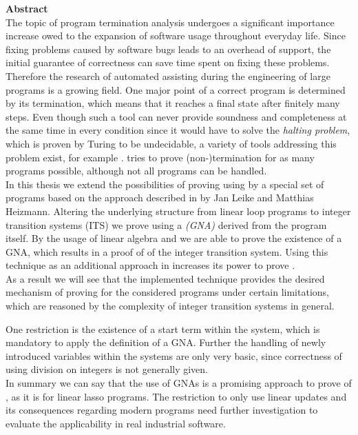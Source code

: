 {\bf\Large Abstract} \\ [1em] 

The topic of program termination analysis undergoes a significant importance increase owed to the expansion of software usage throughout everyday life. Since fixing problems caused by software bugs leads to an overhead of support, the initial guarantee of correctness can save time spent on fixing these problems. Therefore the research of automated assisting during the engineering of large programs is a growing field.
One major point of a correct program is determined by its termination, which means that it reaches a final state after finitely many steps. Even though such a tool can never provide soundness and completeness at the same time in every condition since it would have to solve the \textit{halting problem}, which is proven by Turing to be undecidable, a variety of tools addressing this problem exist, for example \aprove. \aprove tries to prove (non-)termination for as many programs possible, although not all programs can be handled.\newline \\
In this thesis we extend the possibilities of proving \nonterm using \aprove by a special set of programs based on the approach described in \cite{leike2014geometric} by Jan Leike and Matthias Heizmann. Altering the underlying structure from linear loop programs to integer transition systems (ITS) we prove \nonterm using a \textit{\gna (GNA)} derived from the program itself. By the usage of linear algebra and \solver we are able to prove the existence of a GNA, which results in a proof of \nonterm of the integer transition system. Using this technique as an additional approach in \aprove increases its power to prove \nonterm. 
\\
As a result we will see that the implemented technique provides the desired mechanism of proving \nonterm for the considered programs under certain limitations, which are reasoned by the complexity of integer transition systems in general.

 One restriction is the existence of a start term within the system, which is mandatory to apply the definition of a GNA. Further the handling of newly introduced variables within the systems are only very basic, since correctness of using division on integers is not generally given. \newline
\\
In summary we can say that the use of GNAs is a promising approach to prove \nonterm of \itss, as it is for linear lasso programs. The restriction to only use linear updates and its consequences regarding modern programs need further investigation to evaluate the applicability in real industrial software.

